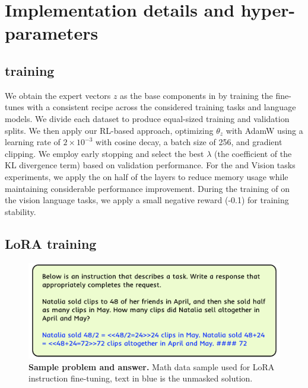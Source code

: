 \section{Implementation details and hyper-parameters}
\label{app:sec:implementation}

\subsection{\svdacro training}
We obtain the expert vectors $z$ as the base components in \implname by training the \svdacro fine-tunes with a consistent recipe across the considered training tasks and language models. 
We divide each dataset to produce equal-sized training and validation splits. We then apply our RL-based approach, optimizing $\theta_z$ with AdamW using a learning rate of $2 \times 10^{-3}$ with cosine decay, a batch size of 256, and gradient clipping. 
We employ early stopping and select the best $\lambda$ (the coefficient of the KL divergence term) based on validation performance. For the \llamaXL and Vision tasks experiments, we apply the \svdacro on half of the layers to reduce memory usage while maintaining considerable performance improvement.
During the training of \llama on the vision language tasks, we apply a small negative reward (-0.1) for training stability.

\subsection{LoRA training}
\begin{figure}
  \centering
  \includegraphics[width=\linewidth]{images/visualization/ift_math_example.pdf}
   \vspace{-6mm}
  \caption{\textbf{Sample problem and answer.} Math data sample used for LoRA instruction fine-tuning, text in blue is the unmasked solution.}
  \label{app:fig:sft_math_example}
\end{figure}


